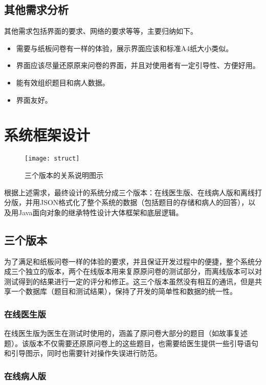 \subsection{其他需求分析}

其他需求包括界面的要求、网络的要求等等，主要归纳如下。

\begin{itemize}
\item 需要与纸板问卷有一样的体验，展示界面应该和标准A4纸大小类似。
\item	界面应该尽量还原原来问卷的界面，并且对使用者有一定引导性、方便好用。
\item 能有效组织题目和病人数据。
\item 界面友好。
\end{itemize}

\section{系统框架设计}

\begin{figure}[h]
  \centering
  \texttt{[image: struct]}
  \caption{三个版本的关系说明图示}
\end{figure}

根据上述需求，最终设计的系统分成三个版本：在线医生版、在线病人版和离线打分版，并用JSON格式化了整个系统的数据（包括题目的存储和病人的回答），以及用Java面向对象的继承特性设计大体框架和底层逻辑。

\subsection{三个版本}

为了满足和纸板问卷一样的体验的要求，并且保证开发过程中的便捷，整个系统分成三个独立的版本，两个在线版本用来复原原问卷的测试部分，而离线版本可以对测试得到的结果进行一定的评分和修正。这三个版本虽然没有相互的通讯，但是共享一个数据库（题目和测试结果），保持了开发的简单性和数据的统一性。

\subsubsection{在线医生版}

在线医生版为医生在测试时使用的，涵盖了原问卷大部分的题目（如故事复述题）。该版本不仅需要还原原问卷上的这些题目，也需要给医生提供一些引导语句和引导图示，同时也需要针对操作失误进行防范。

\subsubsection{在线病人版}

